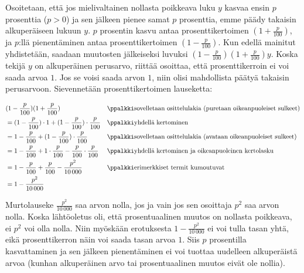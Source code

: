 \begin{esimerkki}
Osoitetaan, että jos mielivaltainen nollasta poikkeava luku $y$ kasvaa ensin $p$ prosenttia ($p>0$) ja sen jälkeen pienee samat $p$ prosenttia, emme päädy takaisin alkuperäiseen lukuun $y$. $p$ prosentin kasvu antaa prosenttikertoimen $(1+\frac{p}{100})$, ja $p$:llä pienentäminen antaa prosenttikertoimen $(1-\frac{p}{100})$. Kun edellä mainitut yhdistetään, saadaan muutosten jälkeiseksi luvuksi $(1-\frac{p}{100})(1+\frac{p}{100})y$. Koska tekijä $y$ on alkuperäinen perusarvo, riittää osoittaa, että prosenttikerroin ei voi saada arvoa $1$. Jos se voisi saada arvon $1$, niin olisi mahdollista päätyä takaisin perusarvoon. Sievennetään prosenttikertoimen lauseketta:
\begin{scriptsize} %
\begin{align*}
&(1-\frac{p}{100})(1+\frac{p}{100}) && \ppalkki \text{sovelletaan osittelulakia (puretaan oikeanpuoleiset sulkeet)} \\
&=(1-\frac{p}{100})\cdot 1 + (1-\frac{p}{100})\cdot \frac{p}{100} && \ppalkki \text{yhdellä kertominen} \\
&=1-\frac{p}{100} + (1-\frac{p}{100})\cdot \frac{p}{100} && \ppalkki \text{sovelletaan osittelulakia (avataan oikeanpuoleiset sulkeet)} \\
&=1-\frac{p}{100} + 1\cdot \frac{p}{100}-\frac{p}{100}\cdot \frac{p}{100}  && \ppalkki \text{yhdellä kertominen ja oikeanpuoleinen kertolasku} \\
&=1-\frac{p}{100} + \frac{p}{100}-\frac{p^2}{10\,000}  && \ppalkki \text{erimerkkiset termit kumoutuvat} \\
&=1-\frac{p^2}{10\,000}  && \\
\end{align*}
\end{scriptsize} %
Murtolauseke $\frac{p^2}{10\,000}$ saa arvon nolla, jos ja vain jos sen osoittaja $p^2$ saa arvon nolla. Koska lähtöoletus oli, että prosentuaalinen muutos on nollasta poikkeava, ei $p^2$ voi olla nolla. Niin myöskään erotuksesta $1-\frac{p^2}{10\,000}$ ei voi tulla tasan yhtä, eikä prosenttikerron näin voi saada tasan arvoa $1$. Siis $p$ prosentilla kasvattaminen ja sen jälkeen pienentäminen ei voi tuottaa uudelleen alkuperäistä arvoa (kunhan alkuperäinen arvo tai prosentuaalinen muutos eivät ole nollia).
\end{esimerkki}


